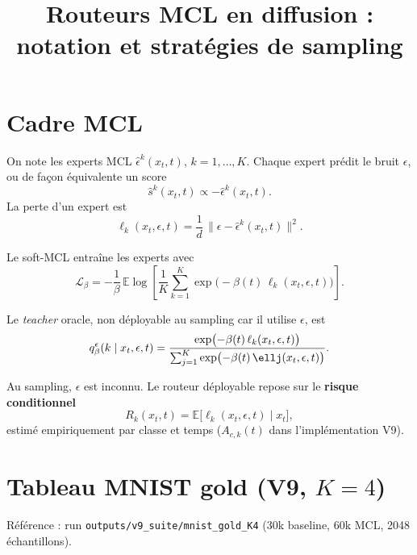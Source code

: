 \documentclass[11pt,a4paper]{article}
\title{Routeurs MCL en diffusion : notation et stratégies de sampling}
\author{}
\date{}
\newcommand{\epshat}{\hat{\epsilon}}
\newcommand{\shat}{\hat{s}}
\newcommand{\ellk}{\ell_k}
\newcommand{\Rk}{R_k}
\begin{document}
\maketitle

\section{Cadre MCL}

On note les experts MCL $\epshat^k(x_t,t)$, $k=1,\ldots,K$.
Chaque expert prédit le bruit $\epsilon$, ou de façon équivalente un score
\[
\shat^k(x_t,t) \propto -\epshat^k(x_t,t).
\]
La perte d'un expert est
\begin{equation}
\ellk(x_t,\epsilon,t) = \frac{1}{d}\,\|\epsilon - \epshat^k(x_t,t)\|^2.
\label{eq:loss}
\end{equation}

Le soft-MCL entraîne les experts avec
\begin{equation}
\mathcal{L}_\beta
= -\frac{1}{\beta}\,
\mathbb{E}\log\!\left[
\frac{1}{K}\sum_{k=1}^{K}\exp\bigl(-\beta(t)\,\ellk(x_t,\epsilon,t)\bigr)
\right].
\label{eq:softmcl}
\end{equation}

Le \emph{teacher} oracle, non déployable au sampling car il utilise $\epsilon$, est
\begin{equation}
q_\beta^{\epsilon}(k \mid x_t,\epsilon,t)
= \frac{\exp\bigl(-\beta(t)\,\ellk(x_t,\epsilon,t)\bigr)}
{\sum_{j=1}^{K}\exp\bigl(-\beta(t)\,\ellj(x_t,\epsilon,t)\bigr)}.
\label{eq:teacher}
\end{equation}

Au sampling, $\epsilon$ est inconnu.
Le routeur déployable repose sur le \textbf{risque conditionnel}
\begin{equation}
\Rk(x_t,t) = \mathbb{E}\bigl[\ellk(x_t,\epsilon,t) \mid x_t\bigr],
\label{eq:risk}
\end{equation}
estimé empiriquement par classe et temps ($A_{c,k}(t)$ dans l'implémentation V9).

\section{Tableau MNIST gold (V9, $K=4$)}

Référence : run \texttt{outputs/v9\_suite/mnist\_gold\_K4} (30k baseline, 60k MCL, 2048 échantillons).
\end{document}
